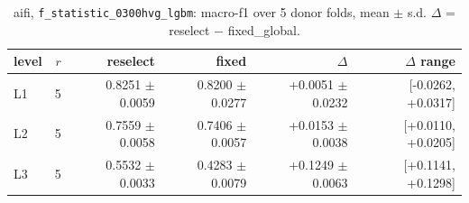 \begin{table}[t]
\centering
\small
\begin{tabular}{lrrrrr}
\toprule
level & $r$ & reselect & fixed & $\Delta$ & $\Delta$ range \\
\midrule
L1 & 5 & 0.8251 $\pm$ 0.0059 & 0.8200 $\pm$ 0.0277 & +0.0051 $\pm$ 0.0232 & [-0.0262, +0.0317] \\
L2 & 5 & 0.7559 $\pm$ 0.0058 & 0.7406 $\pm$ 0.0057 & +0.0153 $\pm$ 0.0038 & [+0.0110, +0.0205] \\
L3 & 5 & 0.5532 $\pm$ 0.0033 & 0.4283 $\pm$ 0.0079 & +0.1249 $\pm$ 0.0063 & [+0.1141, +0.1298] \\
\bottomrule
\end{tabular}
\caption{aifi, \texttt{f\_statistic\_0300hvg\_lgbm}: macro-f1 over 5 donor folds, mean $\pm$ s.d. $\Delta$ = reselect $-$ fixed\_global.}
\label{tab:cv-aifi-f-statistic-0300hvg-lgbm-macro_f1}
\end{table}